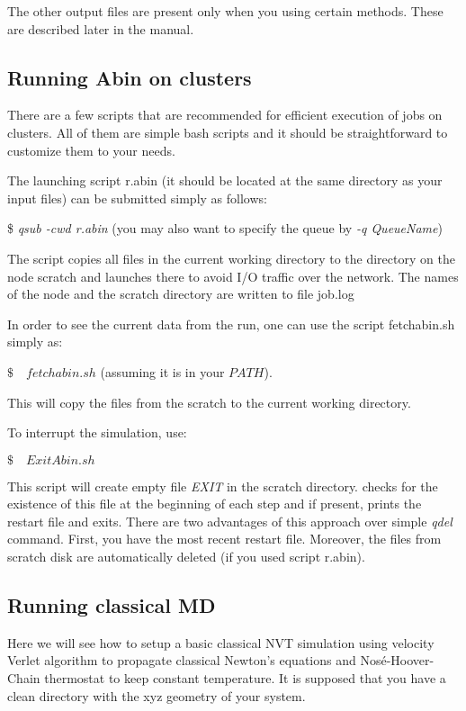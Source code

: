 \documentclass[12pt,a4paper]{article}
\begin{document}
The other output files are present only when you using certain methods. These are described later in the manual.

\subsection{Running Abin on clusters}
\label{sec:clusters}
There are a few scripts that are recommended for efficient execution of \abin jobs on clusters. All of them are simple bash scripts and it should be straightforward to customize them to your needs.

The launching script r.abin (it should be located at the same directory as your input files) can be submitted simply as follows:

\bigskip 
\colorbox{black!20}{\$  \textit{qsub -cwd r.abin}} (you may also want to specify the queue by \textit{-q QueueName})

\bigskip \noindent 
The script copies all files in the current working directory to the directory on the node scratch and launches \abin there to avoid I/O traffic over the network.
The names of the node and the scratch directory are written to file job.log

In order to see the current data from the run, one can use the script fetchabin.sh simply as:

\bigskip
\colorbox{black!20}{$ \$ \quad fetchabin.sh $} (assuming it is in your $PATH$).

\bigskip \noindent 
This will copy the files from the scratch to the current working directory.  

\noindent
To interrupt the simulation, use:

\colorbox{black!20}{$ \$ \quad ExitAbin.sh $}

\bigskip \noindent 
This script will create empty file \textit{EXIT} in the scratch directory. \abin checks for the existence of this file at the beginning of each step and if present, prints the restart file and exits. There are two advantages of this approach over simple \textit{qdel} command. First, you have the most recent restart file. Moreover, the files from scratch disk are automatically deleted (if you used script r.abin).

\subsection{Running classical MD}

Here we will see how to setup a basic classical NVT simulation using velocity Verlet algorithm to propagate classical Newton's equations and Nos\'{e}-Hoover-Chain thermostat to keep constant temperature. 
It is supposed that you have a clean directory with the xyz geometry of your system.
\end{document}
